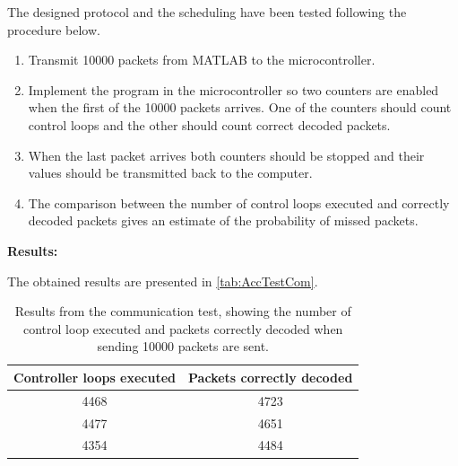 The designed protocol and the scheduling have been tested following the procedure below.
\begin{enumerate}
	\item Transmit 10000 packets from MATLAB to the microcontroller.
    \item Implement the program in the microcontroller so two counters are enabled when the first of the 10000 packets arrives. One of the counters should count control loops and the other should count correct decoded packets.
	\item When the last packet arrives both counters should be stopped and their values should be transmitted back to the computer. 
	\item The comparison between the number of control loops executed and correctly decoded packets gives an estimate of the probability of missed packets.
\end{enumerate} 

\textbf{Results:}

The obtained results are presented in \autoref{tab:AccTestCom}.
\begin{table}[H]
    \centering
    \begin{tabular}{|c|c|}
        \hline
       Controller loops executed  & Packets correctly decoded \\ \hline
       4468 &  4723\\ \hline
       4477 &  4651\\ \hline
       4354 &  4484\\ \hline
    \end{tabular}
    \caption{Results from the communication test, showing the number of control loop executed and packets correctly decoded when sending 10000 packets are sent.}
        \label{tab:AccTestCom}
\end{table}


